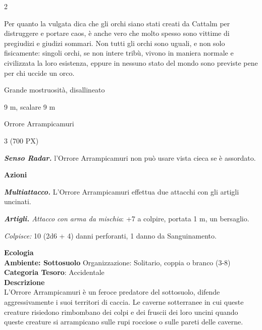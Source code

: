 \begin{multicols}{2}
{Per quanto la vulgata dica che gli orchi siano stati creati da Cattalm per distruggere e portare caos, è anche vero che molto spesso sono vittime di pregiudizi e giudizi sommari. Non tutti gli orchi sono uguali, e non solo fisicamente: singoli orchi, se non intere tribù, vivono in maniera normale e civilizzata la loro esistenza, eppure in nessuno stato del mondo sono previste pene per chi uccide un orco.

\begin{description}[noitemsep, topsep=0pt, parsep=0pt, partopsep=0pt, itemsep=1pt, leftmargin=2.35cm,  labelwidth=2.2cm, itemindent=0cm, listparindent=0pt] %
\setlength{\baselineskip}{10pt}
\item[\textbf{Taglia/Tipo}] Grande mostruosità, disallineato
\item[\textbf{Caratt.}] 
\item[\textbf{Punti Ferita}] 
\item[\textbf{Movimento}] 9 m, scalare 9 m
\item[\textbf{Tiri Salvez.}] 
\item[\textbf{Sensi}] 
\item[\textbf{Linguaggi}] Orrore Arrampicamuri
\item[\textbf{Sfida}] 3 (700 PX)
\end{description}
\smallskip

\emph{\textbf{Senso Radar.}} l'Orrore Arrampicamuri non può usare vista cieca se è assordato.

\textbf{Azioni}

\emph{\textbf{Multiattacco.}} L'Orrore Arrampicamuri effettua due attacchi con gli artigli uncinati.

\emph{\textbf{Artigli.} Attacco con arma da mischia}: +7 a colpire, portata 1 m, un bersaglio.

\emph{Colpisce:} 10 (2d6 + 4) danni perforanti, 1 danno da Sanguinamento.

\textbf{Ecologia}\\
\textbf{Ambiente: Sottosuolo}
Organizzazione: Solitario, coppia o branco (3-8)\\
\textbf{Categoria Tesoro}: Accidentale\\
\textbf{Descrizione}\\
L'Orrore Arrampicamuri è un feroce predatore del sottosuolo, difende aggressivamente i suoi territori di caccia. Le caverne sotterranee in cui queste creature risiedono rimbombano dei colpi e dei fruscii dei loro uncini quando queste creature si arrampicano sulle rupi rocciose o sulle pareti delle caverne.

}
\end{multicols}
